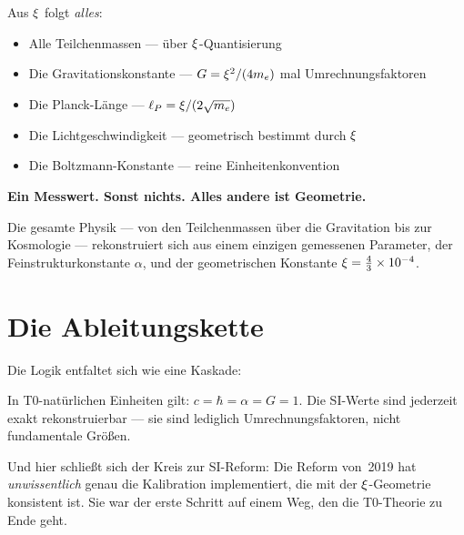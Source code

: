 Aus $\xi$ folgt \emph{alles}:
\begin{itemize}
\item Alle Teilchenmassen --- über $\xi$-Quantisierung
\item Die Gravitationskonstante --- $G = \xi^2/(4m_e)$ mal Umrechnungsfaktoren
\item Die Planck-Länge --- $\ell_P = \xi/(2\sqrt{m_e})$
\item Die Lichtgeschwindigkeit --- geometrisch bestimmt durch $\xi$
\item Die Boltzmann-Konstante --- reine Einheitenkonvention
\end{itemize}

\begin{zusammenfassung}
\textbf{Ein Messwert. Sonst nichts. Alles andere ist Geometrie.}

Die gesamte Physik --- von den Teilchenmassen über die Gravitation bis zur Kosmologie --- rekonstruiert sich aus einem einzigen gemessenen Parameter, der Feinstrukturkonstante $\alpha$, und der geometrischen Konstante $\xi = \frac{4}{3} \times 10^{-4}$.
\end{zusammenfassung}

\section{Die Ableitungskette}

Die Logik entfaltet sich wie eine Kaskade:

\begin{center}
\end{center}

In T0-natürlichen Einheiten gilt: $c = \hbar = \alpha = G = 1$. Die SI-Werte sind jederzeit exakt rekonstruierbar --- sie sind lediglich Umrechnungsfaktoren, nicht fundamentale Größen.

Und hier schließt sich der Kreis zur SI-Reform: Die Reform von~2019 hat \emph{unwissentlich} genau die Kalibration implementiert, die mit der $\xi$-Geometrie konsistent ist. Sie war der erste Schritt auf einem Weg, den die T0-Theorie zu Ende geht.
